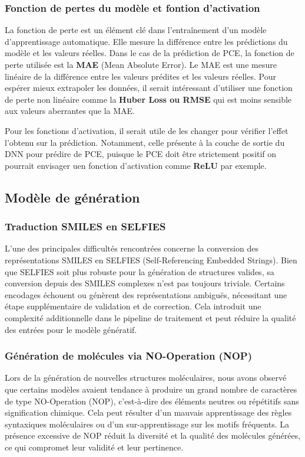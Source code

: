 \subsubsection{Fonction de pertes du modèle et fontion d'activation}
La fonction de perte est un élément clé dans l'entraînement d'un modèle d'apprentissage automatique.
Elle mesure la différence entre les prédictions du modèle et les valeurs réelles.
Dans le cas de la prédiction de PCE, la fonction de perte utilisée est la \textbf{MAE} (Mean Absolute Error).
Le MAE est une mesure linéaire de la différence entre les valeurs prédites et les valeurs réelles.
Pour espérer mieux extrapoler les données, il serait intéressant d'utiliser une fonction de perte non linéaire comme la \textbf{Huber Loss ou RMSE} qui est moins sensible aux valeurs aberrantes que la MAE.

Pour les fonctions d'activation, il serait utile de les changer pour vérifier l'effet l'obtenu sur la prédiction.
Notamment, celle présente à la couche de sortie du DNN pour prédire de PCE, puisque le PCE doit être strictement positif on pourrait envisager uen fonction d'activation comme \textbf{ReLU} par exemple.

\subsection{Modèle de génération}

\subsubsection{Traduction SMILES en SELFIES}

L'une des principales difficultés rencontrées concerne la conversion des représentations SMILES en SELFIES (Self-Referencing Embedded Strings). Bien que SELFIES soit plus robuste pour la génération de structures valides, sa conversion depuis des SMILES complexes n’est pas toujours triviale. Certains encodages échouent ou génèrent des représentations ambiguës, nécessitant une étape supplémentaire de validation et de correction. Cela introduit une complexité additionnelle dans le pipeline de traitement et peut réduire la qualité des entrées pour le modèle génératif.

\subsubsection{Génération de molécules via NO-Operation (NOP)}

Lors de la génération de nouvelles structures moléculaires, nous avons observé que certains modèles avaient tendance à produire un grand nombre de caractères de type NO-Operation (NOP), c’est-à-dire des éléments neutres ou répétitifs sans signification chimique. Cela peut résulter d’un mauvais apprentissage des règles syntaxiques moléculaires ou d’un sur-apprentissage sur les motifs fréquents. La présence excessive de NOP réduit la diversité et la qualité des molécules générées, ce qui compromet leur validité et leur pertinence.
